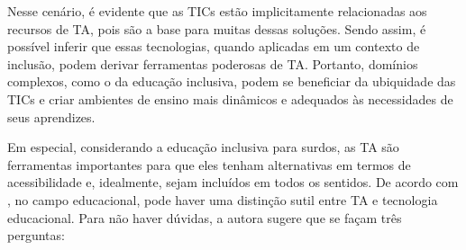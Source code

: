 
Nesse cenário, é evidente que as TICs estão implicitamente relacionadas aos recursos de TA, pois são a base para muitas dessas soluções. Sendo assim, é possível inferir que essas tecnologias, quando aplicadas em um contexto de inclusão, podem derivar ferramentas poderosas de TA. Portanto, domínios complexos, como o da educação inclusiva, podem se beneficiar da ubiquidade das TICs e criar ambientes de ensino mais dinâmicos e adequados às necessidades de seus aprendizes.

Em especial, considerando a educação inclusiva para surdos, as TA são ferramentas importantes para que eles tenham alternativas em termos de acessibilidade e, idealmente, sejam incluídos em todos os sentidos. De acordo com , no campo educacional, pode haver uma distinção sutil entre TA e tecnologia educacional. Para não haver dúvidas, a autora sugere que se façam três perguntas:

